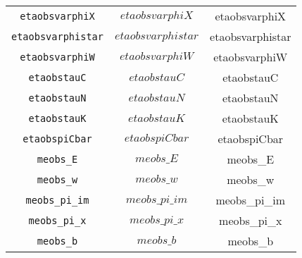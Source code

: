 \begin{center}
\begin{longtable}{ccc}
\texttt{etaobsvarphiX} & $etaobsvarphiX$ & etaobsvarphiX\\
\texttt{etaobsvarphistar} & $etaobsvarphistar$ & etaobsvarphistar\\
\texttt{etaobsvarphiW} & $etaobsvarphiW$ & etaobsvarphiW\\
\texttt{etaobstauC} & $etaobstauC$ & etaobstauC\\
\texttt{etaobstauN} & $etaobstauN$ & etaobstauN\\
\texttt{etaobstauK} & $etaobstauK$ & etaobstauK\\
\texttt{etaobspiCbar} & $etaobspiCbar$ & etaobspiCbar\\
\texttt{meobs\_E} & $meobs\_E$ & meobs\_E\\
\texttt{meobs\_w} & $meobs\_w$ & meobs\_w\\
\texttt{meobs\_pi\_im} & $meobs\_pi\_im$ & meobs\_pi\_im\\
\texttt{meobs\_pi\_x} & $meobs\_pi\_x$ & meobs\_pi\_x\\
\texttt{meobs\_b} & $meobs\_b$ & meobs\_b\\
\hline%
\end{longtable}
\end{center}
